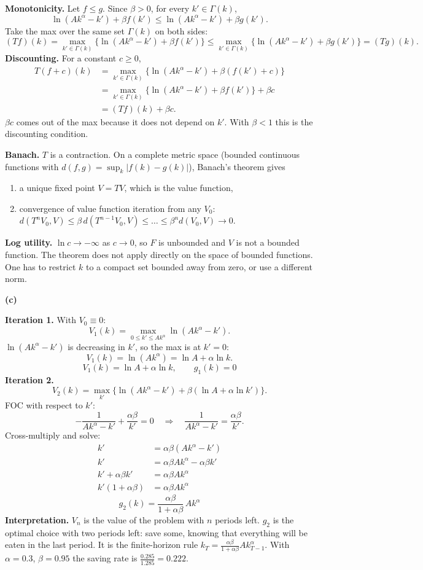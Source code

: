 \documentclass[12pt]{article}
\newcommand{\pt}[1]{\par\bigskip\textbf{(#1)}\par}
\newcommand{\ans}[1]{\[\boxed{\ #1\ }\]}
\begin{document}
\textbf{Monotonicity.} Let $f\le g$. Since $\beta>0$, for every $k'\in\Gamma(k)$,
\[
\ln(Ak^\alpha-k')+\beta f(k')\le\ln(Ak^\alpha-k')+\beta g(k').
\]
Take the max over the same set $\Gamma(k)$ on both sides:
\[
(Tf)(k)=\max_{k'\in\Gamma(k)}\{\ln(Ak^\alpha-k')+\beta f(k')\}\le\max_{k'\in\Gamma(k)}\{\ln(Ak^\alpha-k')+\beta g(k')\}=(Tg)(k).
\]
\textbf{Discounting.} For a constant $c\ge0$,
\begin{align*}
T(f+c)(k)&=\max_{k'\in\Gamma(k)}\{\ln(Ak^\alpha-k')+\beta(f(k')+c)\}\\
&=\max_{k'\in\Gamma(k)}\{\ln(Ak^\alpha-k')+\beta f(k')\}+\beta c\\
&=(Tf)(k)+\beta c .
\end{align*}
$\beta c$ comes out of the max because it does not depend on $k'$. With
$\beta<1$ this is the discounting condition.

\textbf{Banach.} $T$ is a contraction. On a complete metric space (bounded
continuous functions with $d(f,g)=\sup_k|f(k)-g(k)|$), Banach's theorem
gives
\begin{enumerate}
\item a unique fixed point $V=TV$, which is the value function,
\item convergence of value function iteration from any $V_0$:
$d(T^nV_0,V)\le\beta\,d(T^{n-1}V_0,V)\le\dots\le\beta^nd(V_0,V)\to0$.
\end{enumerate}
\textbf{Log utility.} $\ln c\to-\infty$ as $c\to0$, so $F$ is unbounded and
$V$ is not a bounded function. The theorem does not apply directly on the
space of bounded functions. One has to restrict $k$ to a compact set
bounded away from zero, or use a different norm.

\pt{c}
\textbf{Iteration 1.} With $V_0\equiv0$:
\[
V_1(k)=\max_{0\le k'\le Ak^\alpha}\ln(Ak^\alpha-k').
\]
$\ln(Ak^\alpha-k')$ is decreasing in $k'$, so the max is at $k'=0$:
\[
V_1(k)=\ln(Ak^\alpha)=\ln A+\alpha\ln k .
\]
\ans{V_1(k)=\ln A+\alpha\ln k,\qquad g_1(k)=0}
\textbf{Iteration 2.}
\[
V_2(k)=\max_{k'}\big\{\ln(Ak^\alpha-k')+\beta(\ln A+\alpha\ln k')\big\}.
\]
FOC with respect to $k'$:
\[
-\frac{1}{Ak^\alpha-k'}+\frac{\alpha\beta}{k'}=0\quad\Longrightarrow\quad\frac{1}{Ak^\alpha-k'}=\frac{\alpha\beta}{k'}.
\]
Cross-multiply and solve:
\begin{align*}
k'&=\alpha\beta(Ak^\alpha-k')\\
k'&=\alpha\beta Ak^\alpha-\alpha\beta k'\\
k'+\alpha\beta k'&=\alpha\beta Ak^\alpha\\
k'(1+\alpha\beta)&=\alpha\beta Ak^\alpha
\end{align*}
\ans{g_2(k)=\frac{\alpha\beta}{1+\alpha\beta}\,Ak^\alpha}
\textbf{Interpretation.} $V_n$ is the value of the problem with $n$ periods
left. $g_2$ is the optimal choice with two periods left: save some, knowing
that everything will be eaten in the last period. It is the finite-horizon
rule $k_T=\frac{\alpha\beta}{1+\alpha\beta}Ak_{T-1}^\alpha$. With
$\alpha=0.3$, $\beta=0.95$ the saving rate is
$\frac{0.285}{1.285}=0.222$.
\end{document}

